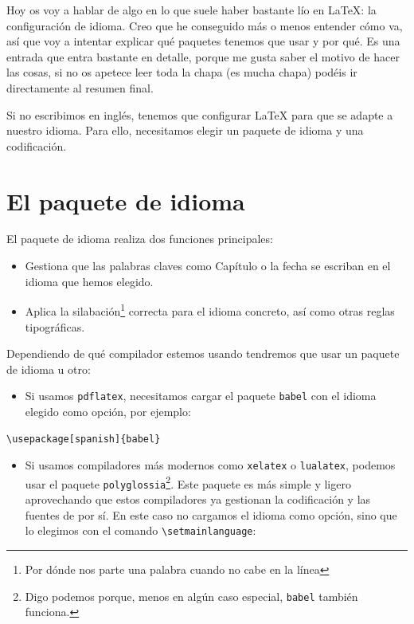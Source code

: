 Hoy os voy a hablar de algo en lo que suele haber bastante lío en LaTeX:
la configuración de idioma. Creo que he conseguido más o menos entender
cómo va, así que voy a intentar explicar qué paquetes tenemos que usar y
por qué. Es una entrada que entra bastante en detalle, porque me gusta
saber el motivo de hacer las cosas, si no os apetece leer toda la chapa
(es mucha chapa) podéis ir directamente al resumen final.

Si no escribimos en inglés, tenemos que configurar LaTeX para que se
adapte a nuestro idioma. Para ello, necesitamos elegir un paquete de
idioma y una codificación.

\section{El paquete de idioma}\label{sec:paqueteIdioma}

El paquete de idioma realiza dos funciones principales:

\begin{itemize}
\item
  Gestiona que las palabras claves como Capítulo o la fecha se escriban
  en el idioma que hemos elegido.
\item
  Aplica la silabación\footnote{Por dónde nos parte una palabra cuando no cabe en
  la línea} correcta para el idioma concreto, así como otras reglas
  tipográficas.
\end{itemize}

Dependiendo de qué compilador estemos usando tendremos que usar un
paquete de idioma u otro:

\begin{itemize}
\item
  Si usamos \lstinline!pdflatex!, necesitamos cargar el paquete \lstinline!babel! con el idioma
  elegido como opción, por ejemplo:
\end{itemize}

\begin{lstlisting}[language={[latex]tex}]
\usepackage[spanish]{babel}
\end{lstlisting}

\begin{itemize}
\item
  Si usamos compiladores más modernos como \lstinline!xelatex! o \lstinline!lualatex!, podemos
  usar el paquete \lstinline!polyglossia!\footnote{Digo podemos porque, menos en algún caso
  especial, \texttt{babel} también funciona.}. Este paquete es más simple y
  ligero aprovechando que estos compiladores ya gestionan la
  codificación y las fuentes de por sí. En este caso no cargamos el
  idioma como opción, sino que lo elegimos con el comando
  \lstinline!\setmainlanguage!:
\end{itemize}

